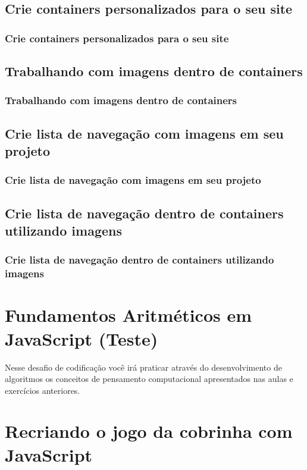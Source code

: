 \documentclass[12pt,a4paper]{article}
\begin{document}
	
	\subsection{Crie containers personalizados para o seu site}
	\subsubsection{Crie containers personalizados para o seu site}
	
	
	\subsection{Trabalhando com imagens dentro de containers}
	\subsubsection{Trabalhando com imagens dentro de containers}
	
	
	\subsection{Crie lista de navegação com imagens em seu projeto}
	\subsubsection{Crie lista de navegação com imagens em seu projeto}
	
	
	\subsection{Crie lista de navegação dentro de containers utilizando imagens}
	\subsubsection{Crie lista de navegação dentro de containers utilizando imagens}
	
	
	\section{Fundamentos Aritméticos em JavaScript (Teste)}
	
	Nesse desafio de codificação você irá praticar através do desenvolvimento de algoritmos os conceitos de pensamento computacional apresentados nas aulas e exercícios anteriores.
	
	\section{Recriando o jogo da cobrinha com JavaScript}
	
\end{document}
